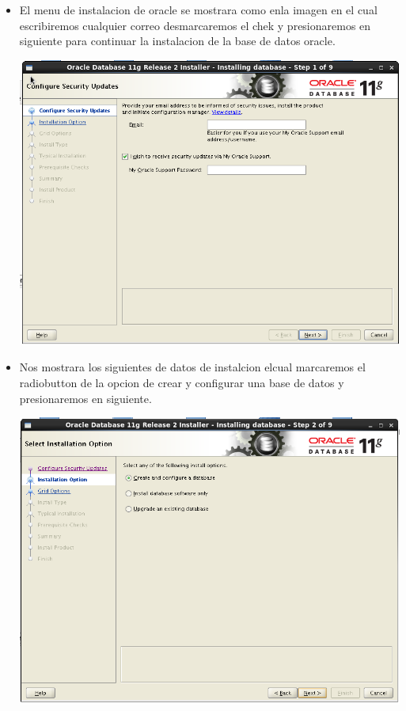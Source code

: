 \begin{itemize}
	\item El menu de instalacion de oracle se mostrara como enla imagen en el cual escribiremos cualquier correo desmarcaremos el chek y presionaremos en siguiente para continuar la instalacion de la base de datos oracle.
	\begin{center}
	\includegraphics[width=14cm]{./Imagenes/img48} 
	\end{center}
\newpage

	\item Nos mostrara los siguientes de datos de instalcion elcual marcaremos el radiobutton de la opcion de crear y configurar una base de datos y presionaremos en siguiente.
	\begin{center}
	\includegraphics[width=13cm]{./Imagenes/img49} 
	\end{center}
	

\end{itemize}
